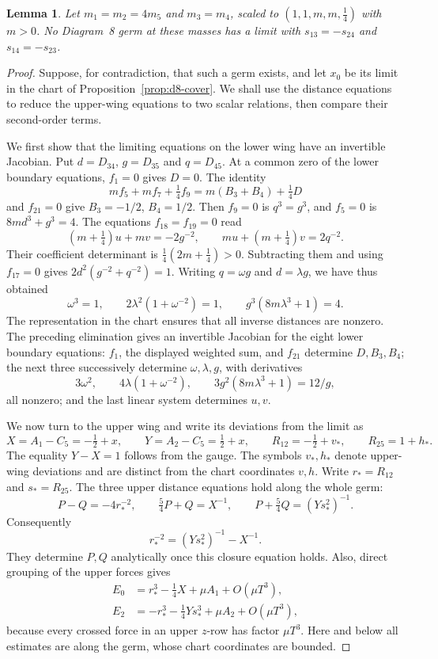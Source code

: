 \documentclass[Threeside,11pt]{article}
\newtheorem{lemma}[theorem]{Lemma}
\theoremstyle{definition}
\theoremstyle{remark}
\numberwithin{equation}{section}
\theoremstyle{remark}
\begin{document}
{\begin{lemma}\label{lem:d8-cancel}
Let $m_1=m_2=4m_5$ and $m_3=m_4$, scaled to
$(1,1,m,m,\frac14)$ with $m>0$.
No Diagram~8 germ at these masses has a limit with
$s_{13}=-s_{24}$ and $s_{14}=-s_{23}$.
\end{lemma}

\begin{proof}
Suppose, for contradiction, that such a germ exists, and let $x_0$ be its limit in
the chart of Proposition~\ref{prop:d8-cover}.
We shall use the distance equations to reduce the upper-wing equations to
two scalar relations, then compare their second-order terms.

We first show that the limiting equations on the lower wing have an invertible
Jacobian.  Put $d=D_{34}$, $g=D_{35}$ and $q=D_{45}$.  At a common zero of the lower boundary equations,
$f_1=0$ gives $D=0$. The identity
\[
m f_5+m f_7+\tfrac14 f_9=m(B_3+B_4)+\tfrac14D
\]
and $f_{21}=0$ give $B_3=-1/2$, $B_4=1/2$.
Then $f_9=0$ is $q^3=g^3$, and $f_5=0$ is $8md^3+g^3=4$.
The equations $f_{18}=f_{19}=0$ read
\[
(m+\tfrac14)u+mv=-2g^{-2},\qquad
mu+(m+\tfrac14)v=2q^{-2}.
\]
Their coefficient determinant is $\tfrac14(2m+\tfrac14)>0$.
Subtracting them and using $f_{17}=0$ gives
$2d^2(g^{-2}+q^{-2})=1$.
Writing $q=\omega g$ and $d=\lambda g$, we have thus obtained
\[
\omega^3=1,\qquad 2\lambda^2(1+\omega^{-2})=1,
\qquad g^3(8m\lambda^3+1)=4.
\]
The representation in the chart ensures that all inverse distances are nonzero.
The preceding elimination gives an invertible Jacobian for the eight lower boundary equations:
$f_1$, the displayed weighted sum, and $f_{21}$ determine $D,B_3,B_4$;
the next three successively determine
$\omega,\lambda,g$, with derivatives
\[
3\omega^2,\qquad4\lambda(1+\omega^{-2}),\qquad
3g^2(8m\lambda^3+1)=12/g,
\]
all nonzero; and the last linear system determines $u,v$.

We now turn to the upper wing and write its deviations from the limit as
\[
X=A_1-C_5=-\tfrac12+x,\qquad
Y=A_2-C_5=\tfrac12+x,\qquad
R_{12}=-\tfrac12+v_*,\qquad R_{25}=1+h_*.
\]
The equality $Y-X=1$ follows from the gauge.  The symbols $v_*,h_*$
denote upper-wing deviations and are distinct from the chart coordinates $v,h$.
Write $r_*=R_{12}$ and $s_*=R_{25}$.
The three upper distance equations hold along the whole germ:
\[
P-Q=-4r_*^{-2},\qquad
\tfrac54 P+Q=X^{-1},\qquad
P+\tfrac54Q=(Ys_*^2)^{-1}.
\]
Consequently
\begin{equation}\label{eq:d8-upper-closure-analytic}
r_*^{-2}=(Ys_*^2)^{-1}-X^{-1}.
\end{equation}
They determine $P,Q$ analytically once this closure equation holds.
Also, direct grouping of the upper forces gives
\begin{align*}
E_0&=r_*^3-\tfrac14X+\mu A_1+O(\mu T^3),\\
E_2&=-r_*^3-\tfrac14Ys_*^3+\mu A_2+O(\mu T^3),
\end{align*}
because every crossed force in an upper $z$-row has factor $\mu T^3$.
Here and below all estimates are along the germ, whose chart coordinates
are bounded.


\end{proof}}
\end{document}
